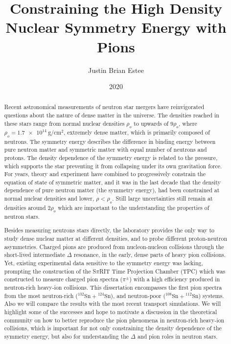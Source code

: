 \documentclass[]{msu-thesis}
\title{Constraining the High Density Nuclear Symmetry Energy with Pions}
\author{Justin Brian Estee}
\date{2020}
\newcommand{\spirit}{S$\pi$RIT }
\newcommand{\tin}[2]{{}^{#1}\mathrm{Sn} + {}^{#2}\mathrm{Sn}}
\begin{document}

\frontmatter
\maketitlepage
\begin{abstract}

Recent astronomical measurements of neutron star mergers have reinvigorated questions about the nature of dense matter in the universe. The densities reached in these stars range from  normal nuclear densities $\rho_o$ to upwards of $9\rho_o$, where $\rho_o = \SI{1.7e14}{\gram\per\centi\metre\squared}$, extremely dense matter, which is primarily composed of neutrons. The symmetry energy describes the difference in binding energy between pure neutron matter and symmetric matter with equal number of neutrons and protons. The density dependence of the symmetry energy is related to the pressure, which supports the star preventing it from collapsing under its own gravitation force. For years, theory and experiment  have combined to progressively constrain the equation of state of symmetric matter, and it was in the last decade that the density dependence of pure neutron matter (the symmetry energy), had been constrained at normal nuclear densities and lower, $\rho < \rho_o$. Still large uncertainties still remain at densities around 2$\rho_o$ which are important to the understanding the properties of neutron stars.

Besides measuring neutrons stars directly, the laboratory provides the only way to study dense nuclear matter at different densities, and to probe different proton-neutron asymmetries. Charged pions are produced from nucleon-nucleon collisions through the short-lived intermediate $\Delta$ resonance, in the early, dense parts of heavy pion collisions. Yet, existing experimental data sensitive to the symmetry energy was lacking, prompting the construction of the \spirit Time Projection Chamber (TPC) which was constructed to measure charged pion spectra ($\pi^\pm$) with a high efficiency produced in neutron-rich heavy-ion collisions. This dissertation encompasses the first pion spectra from the most neutron-rich ($\tin{132}{124}$), and neutron-poor ($\tin{108}{112}$) systems. Also we will compare the results with the most recent transport  simulations. We will highlight some of the successes and hope to motivate a discussion in the theoretical community on how to better reproduce the pion phenomena in neutron-rich heavy-ion collisions, which is important for not only constraining the density dependence of the symmetry energy, but also for understanding the $\Delta$ and pion roles in neutron stars. 


\end{abstract}
\end{document}
